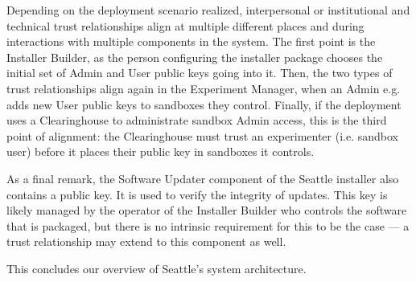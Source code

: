 Depending on the deployment scenario realized, interpersonal
or institutional
and technical trust relationships align at multiple different places
and during interactions with multiple components in the system.
The first point is the Installer Builder, as the person configuring
the installer package chooses the initial set of Admin and User public
keys going into it. Then, the two types of trust relationships align
again in the Experiment Manager, when an Admin e.g. adds new User public
keys to sandboxes they control. Finally, if the deployment uses a
Clearinghouse to administrate sandbox Admin access, this is the
third point of alignment: the Clearinghouse must trust an experimenter
(i.e. sandbox user) before it places their public key in sandboxes
it controls.

As a final remark, the Software Updater component of the
Seattle installer also contains a public key. It is used to
verify the integrity of updates. This key is likely managed by
the operator of the Installer Builder who controls the software
that is packaged, but there is no intrinsic requirement for this
to be the case --- a trust relationship may extend to
this component as well.

This concludes our overview of Seattle's system architecture.
